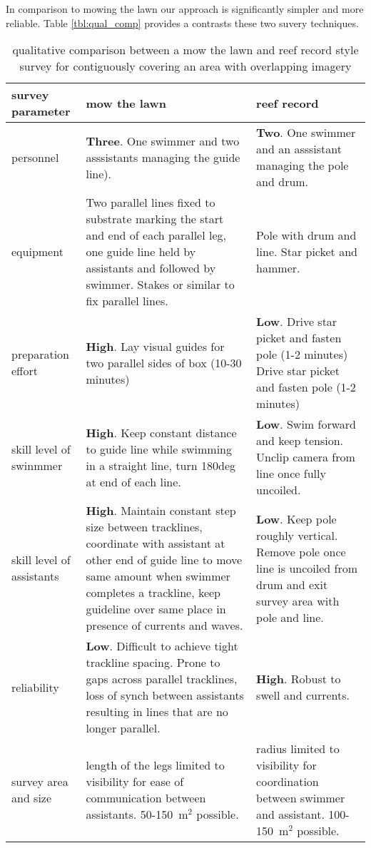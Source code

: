 In comparison to mowing the lawn \cite{Mahon_2011} our approach is significantly simpler and more reliable. Table \ref{tbl:qual_comp} provides a contrasts these two suvery techniques.
\begin{table} 
    \begin{tabular}{ | p{} | p{} | p{} |}
    \hline
survey parameter & mow the lawn & reef record \\
\hline
personnel & \textbf{Three}. One swimmer and two asssistants managing the guide line). & \textbf{Two}. One swimmer and an asssistant managing the pole and drum. \\
\hline
equipment & Two parallel lines fixed to substrate marking the start and end of each parallel leg, one guide line held by assistants and followed by swimmer. Stakes or similar to fix parallel lines. & Pole with drum and line. Star picket and hammer.  \\ 
\hline
preparation effort & \textbf{High}. Lay visual guides for two parallel sides of box (10-30 minutes) & \textbf{Low}. Drive star picket and fasten pole (1-2 minutes) Drive star picket and fasten pole (1-2 minutes) \\ 
\hline
skill level of swinmmer & \textbf{High}. Keep constant distance to guide line while swimming in a straight line, turn 180deg at end of each line. & \textbf{Low}. Swim forward and keep tension. Unclip camera from line once fully uncoiled. \\ 
\hline
        skill level of assistants & \textbf{High}. Maintain constant step size between tracklines, coordinate with assistant at other end of guide line to move same amount when swimmer completes a trackline, keep guideline over same place in presence of currents and waves. & \textbf{Low}. Keep pole roughly vertical. Remove pole once line is uncoiled from drum and exit survey area with pole and line. \\
\hline
reliability & \textbf{Low}. Difficult to achieve tight trackline spacing. Prone to gaps across parallel tracklines, loss of synch between assistants resulting in lines that are no longer parallel. & \textbf{High}. Robust to swell and currents. {Easy to achieve tight trackline spacing by using narrower drum. \\ 
\hline
survey area and size & length of the legs limited to visibility for ease of communication between assistants. 50-150~m$^2$ possible.   & radius limited to visibility for coordination between swimmer and assistant. 100-150~m$^2$ possible.    \\ 
\hline
    \end{tabular} 
    \caption{qualitative comparison between a mow the lawn and reef record style survey for contiguously covering an area with overlapping imagery} 
\end{table}


